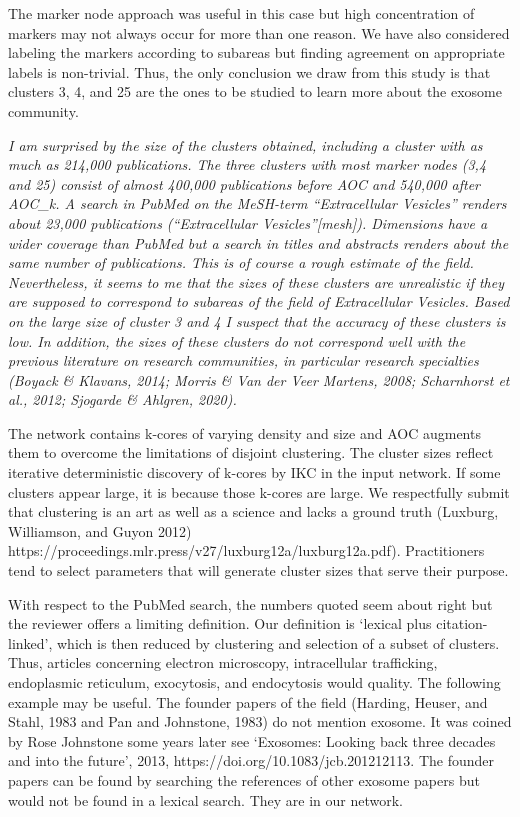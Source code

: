 \documentclass[11pt, oneside]{article}   	%
\begin{document}
The marker node approach was useful in this case but high concentration of markers may not always occur for more than one reason. We have also considered labeling the markers according to subareas but finding agreement on appropriate labels is non-trivial. Thus, the only conclusion we draw from this study is that clusters 3, 4, and 25 are the ones to be studied to learn more about the exosome community. 

\vspace{2 mm}  
\emph{ I am surprised by the size of the clusters obtained, including a cluster with as much as 214,000 publications. The three clusters with most marker nodes (3,4 and 25) consist of almost 400,000 publications before AOC and 540,000 after AOC\_k. A search in PubMed on the MeSH-term “Extracellular Vesicles” renders about 23,000 publications (“Extracellular Vesicles”[mesh]). Dimensions have a wider coverage than PubMed but a search in titles and abstracts renders about the same number of publications. This is of course a rough estimate of the field. Nevertheless, it seems to me that the sizes of these clusters are unrealistic if they are supposed to correspond to subareas of the field of Extracellular Vesicles. Based on the large size of cluster 3 and 4 I suspect that the accuracy of these clusters is low. In addition, the sizes of these clusters do not correspond well with the previous literature on research communities, in particular research specialties (Boyack \& Klavans, 2014; Morris \& Van der Veer Martens, 2008; Scharnhorst et al., 2012; Sjogarde \& Ahlgren, 2020).}

\vspace{2 mm} 
The network contains k-cores of varying density and size and AOC augments them to overcome the limitations of disjoint clustering. The cluster sizes reflect iterative deterministic discovery of k-cores by IKC in the input network. If some clusters appear large, it is because those k-cores are large. We respectfully submit that clustering is an art as well as a science and lacks a ground truth (Luxburg, Williamson, and Guyon 2012) 
https://proceedings.mlr.press/v27/luxburg12a/luxburg12a.pdf). Practitioners tend to select parameters that will generate cluster sizes that serve their purpose. 

With respect to the PubMed search, the numbers quoted seem about right but the reviewer offers a limiting definition. Our definition is `lexical plus citation-linked', which is then reduced by clustering and selection of a subset of clusters. Thus, articles concerning electron microscopy, intracellular trafficking, endoplasmic reticulum, exocytosis, and endocytosis would quality. The following example may be useful. The founder papers of the field (Harding, Heuser, and Stahl, 1983 and Pan and Johnstone, 1983) do not mention exosome. It was coined by Rose Johnstone some years later see `Exosomes: Looking back three decades and into the future', 2013, https://doi.org/10.1083/jcb.201212113. The founder papers can be found by searching the references of other exosome papers but would not be found in a lexical search. They are in our network.
\end{document}
